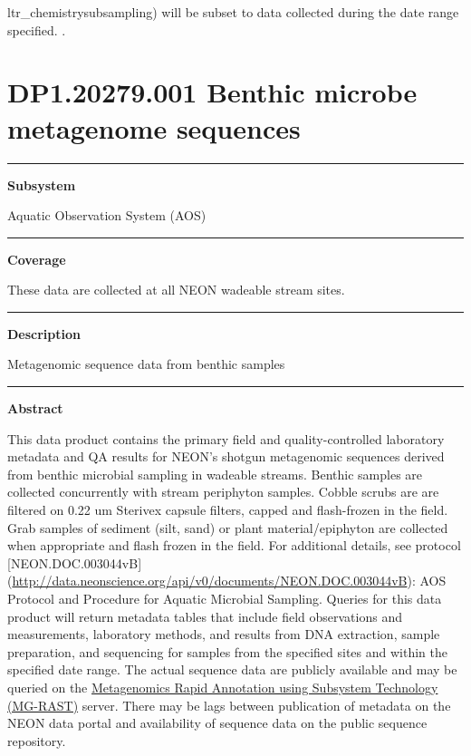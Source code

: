 \documentclass[]{article}
\begin{document}
ltr\_chemistrysubsampling) will be subset to data collected during the
date range specified. \newpage
.

\section{DP1.20279.001 Benthic microbe metagenome
sequences}\label{dp1.20279.001-benthic-microbe-metagenome-sequences}

\begin{center}\rule{0.5\linewidth}{\linethickness}\end{center}

\textbf{Subsystem}

Aquatic Observation System (AOS)

\begin{center}\rule{0.5\linewidth}{\linethickness}\end{center}

\textbf{Coverage}

These data are collected at all NEON wadeable stream sites.

\begin{center}\rule{0.5\linewidth}{\linethickness}\end{center}

\textbf{Description}

Metagenomic sequence data from benthic samples

\begin{center}\rule{0.5\linewidth}{\linethickness}\end{center}

\textbf{Abstract}

This data product contains the primary field and quality-controlled
laboratory metadata and QA results for NEON's shotgun metagenomic
sequences derived from benthic microbial sampling in wadeable streams.
Benthic samples are collected concurrently with stream periphyton
samples. Cobble scrubs are are filtered on 0.22 um Sterivex capsule
filters, capped and flash-frozen in the field. Grab samples of sediment
(silt, sand) or plant material/epiphyton are collected when appropriate
and flash frozen in the field. For additional details, see protocol
{[}NEON.DOC.003044vB{]}
(\url{http://data.neonscience.org/api/v0/documents/NEON.DOC.003044vB}):
AOS Protocol and Procedure for Aquatic Microbial Sampling. Queries for
this data product will return metadata tables that include field
observations and measurements, laboratory methods, and results from DNA
extraction, sample preparation, and sequencing for samples from the
specified sites and within the specified date range. The actual sequence
data are publicly available and may be queried on the
\href{http://metagenomics.anl.gov/}{Metagenomics Rapid Annotation using
Subsystem Technology (MG-RAST)} server. There may be lags between
publication of metadata on the NEON data portal and availability of
sequence data on the public sequence repository.
\end{document}
